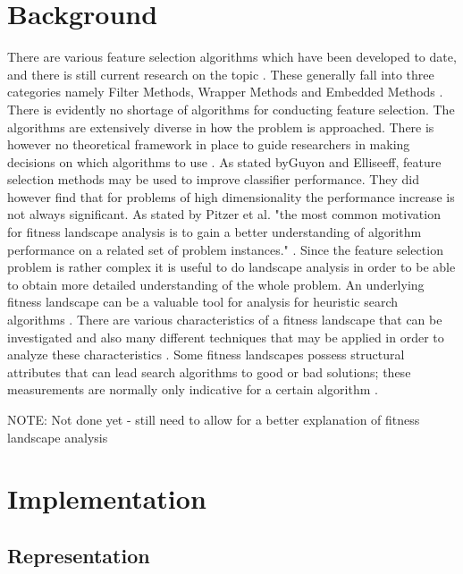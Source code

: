 \documentclass[journal,comsoc]{IEEEtran}
\begin{document}
\section{Background}

There are various feature selection algorithms which have been developed to date, and there is still current research on the topic \cite{kira1992feature, jain1997feature, kohavi1997wrappers, yu2003feature, yeh2016feature, ge2016mctwo}. These generally fall into three categories namely Filter Methods, Wrapper Methods and Embedded Methods \cite{chandrashekar2014survey}. There is evidently no shortage of algorithms for conducting feature selection. The algorithms are extensively diverse in how the problem is approached. There is however no theoretical framework in place to guide researchers in making decisions on which algorithms to use \cite{guyon2003introduction}. As stated byGuyon and Elliseeff, feature selection methods may be used to improve classifier performance. They did however find that for problems of high dimensionality the performance increase is not always significant.  As stated by Pitzer et al. "the most common motivation for fitness landscape analysis is to gain a better understanding of algorithm performance on a related set of problem instances." \cite{pitzer2012comprehensive}. Since the feature selection problem is rather complex it is useful to do landscape analysis in order to be able to obtain more detailed understanding of the whole problem. An underlying fitness landscape can be a valuable tool for analysis for heuristic search algorithms \cite{pitzer2012comprehensive}. There are various characteristics of a fitness landscape that can be investigated and also many different techniques that may be applied in order to analyze these characteristics \cite{malan2013survey} . Some fitness landscapes possess structural attributes that can lead search algorithms to good or bad solutions; these measurements are normally only indicative for a certain algorithm \cite{malan2013survey}.  

NOTE: Not done yet - still need to allow for a better explanation of fitness landscape analysis

\section{Implementation}
\subsection{Representation}
\end{document}
